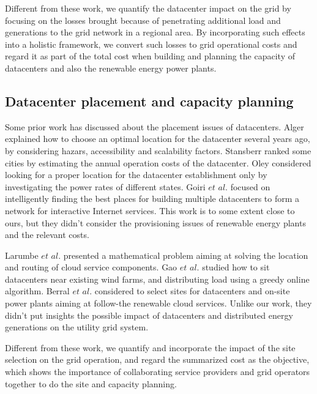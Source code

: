 Different from these work, we quantify the datacenter impact on the grid by focusing on the losses brought because of penetrating additional load and generations to the grid network in a regional area. By incorporating such effects into a holistic framework, we convert such losses to grid operational costs and regard it as part of the total cost when building and planning the capacity of datacenters and also the renewable energy power plants.

\subsection{Datacenter placement and capacity planning}

Some prior work has discussed about the placement issues of datacenters. Alger \cite{Dalger05} explained how to choose an optimal location for the datacenter several years ago, by considering hazars, accessibility and scalability factors. Stansberr \cite{Stansberr06} ranked some cities by estimating the annual operation costs of the datacenter. Oley \cite{Boley09} considered looking for a proper location for the datacenter establishment only by investigating the power rates of different states.
Goiri $\textit{et al.}$ \cite{Goiri11place} focused on intelligently finding the best places for building multiple datacenters to form a network for interactive Internet services. This work is to some extent close to ours, but they didn't consider the provisioning issues of renewable energy plants and the relevant costs.

Larumbe $\textit{et al.}$ \cite{larumbe2012optimal} presented a mathematical problem aiming at solving the location and routing of cloud service components. Gao $\textit{et al.}$ \cite{gao2013answer} studied how to sit datacenters near existing wind farms, and distributing load using a greedy online algorithm.
Berral $\textit{et al.}$ \cite{berral2014building} considered to select sites for datacenters and on-site power plants aiming at follow-the renewable cloud services. Unlike our work, they didn't put insights the possible impact of datacenters and distributed energy generations on the utility grid system.

Different from these work, we quantify and incorporate the impact of the site selection on the grid operation, and regard the summarized cost as the objective, which shows the importance of collaborating service providers and grid operators together to do the site and capacity planning.

